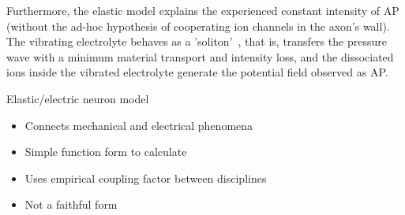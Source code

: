 Furthermore, the  elastic model explains the experienced constant intensity
of \gls{AP} (without the ad-hoc hypothesis of cooperating
ion channels in the axon's wall). The vibrating electrolyte 
behaves as a 'soliton'~\cite{SolitonPropagation:2005}, that is, transfers the pressure wave with a minimum material transport and intensity loss, and the dissociated ions inside the vibrated electrolyte generate the potential field observed as \gls{AP}.


\proconpanel
{Elastic/electric neuron model}
{
\begin{itemize}[noitemsep]
	\item Connects mechanical and electrical phenomena
	\item Simple function form to calculate
\end{itemize}
}
{
\begin{itemize}[noitemsep]
	\item Uses empirical coupling factor between disciplines
	\item Not a faithful form
\end{itemize}
}
